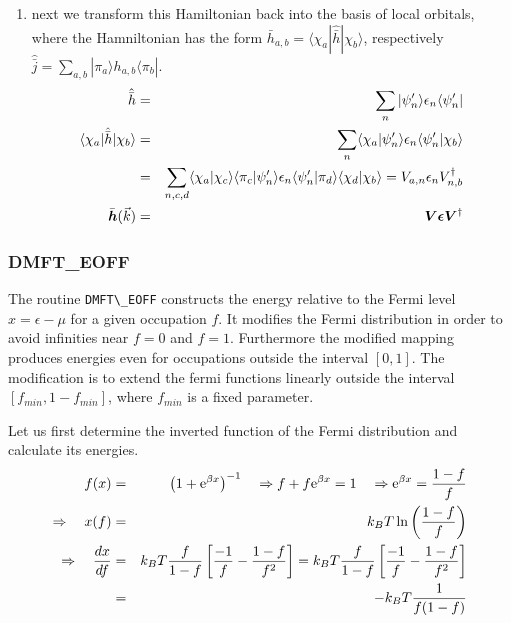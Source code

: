 \documentclass[11pt,a4paper]{report}
\begin{document}
\begin{enumerate}
%
\item next we transform this Hamiltonian back into the basis of local
  orbitals, where the Hamniltonian has the form
  $\bar{h}_{a,b}=\langle\chi_a|\hat{\bar{h}}|\chi_b\rangle$,
  respectively $\hat{\bar{j}}=\sum_{a,b}|\pi_a\rangle
  h_{a,b}\langle\pi_b|$.
  \begin{eqnarray}
    \hat{\bar{h}}&=&\sum_n|\psi'_n\rangle\epsilon_n\langle\psi'_n|
  \nonumber\\
    \langle\chi_a|\hat{\bar{h}}|\chi_b\rangle&=&
    \sum_n\langle\chi_a|\psi'_n\rangle\epsilon_n\langle\psi'_n|\chi_b\rangle
   \nonumber\\
    &=&
    \sum_{n,c,d}\langle\chi_a|\chi_c\rangle\langle\pi_c|\psi'_n\rangle\epsilon_n
     \langle\psi'_n|\pi_d\rangle\langle\chi_d|\chi_b\rangle
    =V_{a,n}\epsilon_n V^\dagger_{n,b}
   \nonumber\\
     \bar{\bm{h}}(\vec{k})&=&
       \bm{V}\bm{\epsilon}\bm{V}^\dagger
   \end{eqnarray}
\end{enumerate}

\subsubsection{DMFT\_EOFF}
\label{sec:dmfteoff}
The routine \verb|DMFT\_EOFF| constructs the energy relative to the
Fermi level $x=\epsilon-\mu$ for a given occupation $f$. It modifies
the Fermi distribution in order to avoid infinities near $f=0$ and
$f=1$. Furthermore the modified mapping produces energies even for
occupations outside the interval $[0,1]$. The modification is to
extend the fermi functions linearly outside the interval
$[f_{min},1-f_{min}]$, where $f_{min}$ is a fixed parameter.

Let us first determine the inverted function of the Fermi distribution
and calculate its energies.
\begin{eqnarray}
f(x)&=&\left(1+\mathrm{e}^{\beta x}\right)^{-1}
\quad\Rightarrow f+f\mathrm{e}^{\beta x}=1
\quad\Rightarrow \mathrm{e}^{\beta x}=\frac{1-f}{f}
\\
\Rightarrow\quad
x(f)&=&k_BT\ln\left(\frac{1-f}{f}\right)
\\
\Rightarrow\quad
\frac{dx}{df}&=&k_BT\frac{f}{1-f}\left[\frac{-1}{f}-\frac{1-f}{f^2}\right]
=k_BT\frac{f}{1-f}\left[\frac{-1}{f}-\frac{1-f}{f^2}\right]
\nonumber\\
&=&-k_BT\frac{1}{f(1-f)}
\end{eqnarray}
\end{document}
